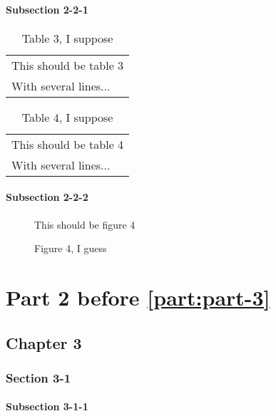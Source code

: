 \documentclass[10pt]{book}
\begin{document}
\subsection{Subsection 2-2-1}
\label{sec:subsection-2-2-1}

\begin{table}
  \centering
  \begin{tabular}{l}
    This should be table 3\\
    With several lines...
  \end{tabular}
  \caption{Table 3, I suppose}
  \label{tab:table-3}
\end{table}

\begin{table}
  \centering
  \begin{tabular}{l}
    This should be table 4\\
    With several lines...
  \end{tabular}
  \caption{Table 4, I suppose}
  \label{tab:table-4}
\end{table}


\subsection{Subsection 2-2-2}
\label{sec:subsection-2-2-2}

\begin{figure}
  \centering
  This should be figure 4
  \caption{Figure 4, I guess}
  \label{fig:figure-4}
\end{figure}


\part{Part 2 before \ref{part:part-3}}
\label{part:part-2}
\parttoc
\partlot
\partlof

\chapter{Chapter 3}
\label{cha:chapter-3}
\minitoc
\minilot
\minilof


\section{Section 3-1}
\label{sec:section-3-1}


\subsection{Subsection 3-1-1}
\label{sec:subsection-3-1-1}
\end{document}
